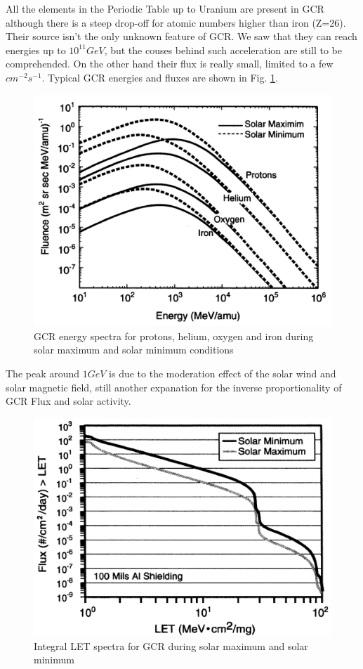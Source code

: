 \documentclass[./dissertation.tex]{subfiles}
\begin{document}
All the elements in the Periodic Table up to Uranium are present in GCR although there is a steep drop-off for atomic numbers higher than iron (Z=26). Their source isn't the only unknown feature of GCR. We saw that they can reach energies up to $10^{11}GeV$, but the couses behind such acceleration are still to be comprehended. On the other hand their flux is really small, limited to a few $cm^{-2}s^{-1}$. Typical GCR energies and fluxes are shown in Fig. \ref{fig:enflux}.


\begin{figure}[!ht]
   \centering
    \includegraphics[scale=.5]{imgs/GCR_energy_p.png}
   \caption{GCR energy spectra for protons, helium, oxygen and iron during solar maximum and solar minimum conditions}
   \label{fig:enflux}
\end{figure}
The peak around $1GeV$ is due to the moderation effect of the solar wind and solar magnetic field, still another expanation for the inverse proportionality of GCR Flux and solar activity.
\begin{figure}[!h]
   \centering
    \includegraphics[scale=.5]{imgs/LET_sun.png}
   \caption{Integral LET spectra  for GCR during  solar  maximum  and solar minimum}
   \label{fig:sub1}
\end{figure}
\end{document}
